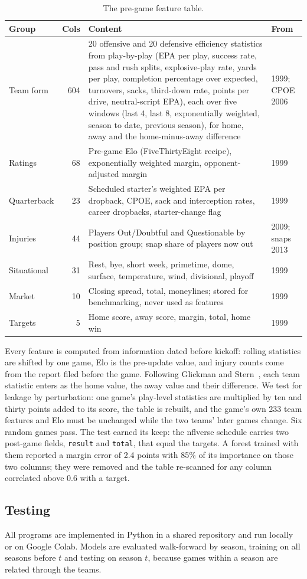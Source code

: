 \begin{table}[H]
\centering
\small
\begin{tabular}{p{2.2cm}rp{8.3cm}p{1.9cm}}
\toprule
\textbf{Group} & \textbf{Cols} & \textbf{Content} & \textbf{From} \\
\midrule
Team form & 604 & 20 offensive and 20 defensive efficiency statistics from play-by-play (EPA per play, success rate, pass and rush splits, explosive-play rate, yards per play, completion percentage over expected, turnovers, sacks, third-down rate, points per drive, neutral-script EPA), each over five windows (last 4, last 8, exponentially weighted, season to date, previous season), for home, away and the home-minus-away difference & 1999; CPOE 2006 \\
Ratings & 68 & Pre-game Elo (FiveThirtyEight recipe), exponentially weighted margin, opponent-adjusted margin & 1999 \\
Quarterback & 23 & Scheduled starter's weighted EPA per dropback, CPOE, sack and interception rates, career dropbacks, starter-change flag & 1999 \\
Injuries & 44 & Players Out/Doubtful and Questionable by position group; snap share of players now out & 2009; snaps 2013 \\
Situational & 31 & Rest, bye, short week, primetime, dome, surface, temperature, wind, divisional, playoff & 1999 \\
Market & 10 & Closing spread, total, moneylines; stored for benchmarking, never used as features & 1999 \\
Targets & 5 & Home score, away score, margin, total, home win & 1999 \\
\bottomrule
\end{tabular}
\caption{The pre-game feature table.}
\label{tab:features}
\end{table}

Every feature is computed from information dated before kickoff: rolling statistics are shifted by one game, Elo is the pre-update value, and injury counts come from the report filed before the game. Following Glickman and Stern~\cite{glickmanstern2017}, each team statistic enters as the home value, the away value and their difference. We test for leakage by perturbation: one game's play-level statistics are multiplied by ten and thirty points added to its score, the table is rebuilt, and the game's own 233 team features and Elo must be unchanged while the two teams' later games change. Six random games pass. The test earned its keep: the nflverse schedule carries two post-game fields, \texttt{result} and \texttt{total}, that equal the targets. A forest trained with them reported a margin error of 2.4 points with 85\% of its importance on those two columns; they were removed and the table re-scanned for any column correlated above 0.6 with a target.

\subsection{Testing}

All programs are implemented in Python in a shared repository and run locally or on Google Colab. Models are evaluated walk-forward by season, training on all seasons before $t$ and testing on season $t$, because games within a season are related through the teams.
